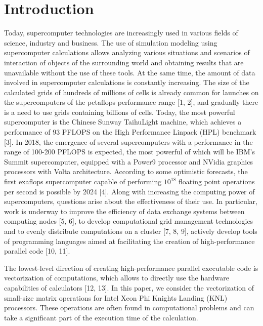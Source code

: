 \documentclass[
11pt,%
tightenlines,%
twoside,%
onecolumn,%
nofloats,%
nobibnotes,%
nofootinbib,%
superscriptaddress,%
noshowpacs,%
centertags]%
{revtex4}
\begin{document}

\section{Introduction}

Today, supercomputer technologies are increasingly used in various fields of science, industry and business. The use of simulation modeling using supercomputer calculations allows analyzing various situations and scenarios of interaction of objects of the surrounding world and obtaining results that are unavailable without the use of these tools. At the same time, the amount of data involved in supercomputer calculations is constantly increasing. The size of the calculated grids of hundreds of millions of cells is already common for launches on the supercomputers of the petaflops performance range [1, 2], and gradually there is a need to use grids containing billions of cells. Today, the most powerful supercomputer is the Chinese Sunway TaihuLight machine, which achieves a performance of 93 PFLOPS on the High Performance Linpack (HPL) benchmark [3]. In 2018, the emergence of several supercomputers with a performance in the range of 100-200 PFLOPS is expected, the most powerful of which will be IBM's Summit supercomputer, equipped with a Power9 processor and NVidia graphics processors with Volta architecture. According to some optimistic forecasts, the first exaflops supercomputer capable of performing $10^18$ floating point operations per second is possible by 2024 [4]. Along with increasing the computing power of supercomputers, questions arise about the effectiveness of their use. In particular, work is underway to improve the efficiency of data exchange systems between computing nodes [5, 6], to develop computational grid management technologies and to evenly distribute computations on a cluster [7, 8, 9], actively develop tools of programming languages ​​aimed at facilitating the creation of high-performance parallel code [10, 11].

The lowest-level direction of creating high-performance parallel executable code is vectorization of computations, which allows to directly use the hardware capabilities of calculators [12, 13]. In this paper, we consider the vectorization of small-size matrix operations for Intel Xeon Phi Knights Landing (KNL) processors. These operations are often found in computational problems and can take a significant part of the execution time of the calculation.
\end{document}

